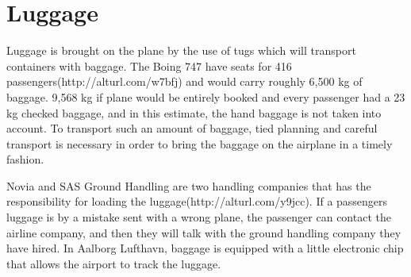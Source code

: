 \section{Luggage}
Luggage is brought on the plane by the use of tugs which will transport containers with baggage. The Boing 747 have seats for 416 passengers(http://alturl.com/w7bfj) and would carry roughly 6,500 kg of baggage. 9,568 kg if plane would be entirely booked and every passenger had a 23 kg checked baggage, and in this estimate, the hand baggage is not taken into account. To transport such an amount of baggage, tied planning and careful transport is necessary in order to bring the baggage on the airplane in a timely fashion.


Novia and SAS Ground Handling are two handling companies that has the responsibility for loading the luggage(http://alturl.com/y9jcc). If a passengers luggage is by a mistake sent with a wrong plane, the passenger can contact the airline company, and then they will talk with the ground handling company they have hired. In Aalborg Lufthavn, baggage is equipped with a little electronic chip that allows the airport to track the luggage.